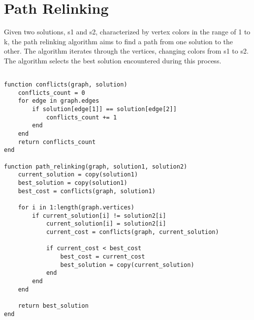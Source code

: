 \documentclass{article}
\begin{document}
\section{Path Relinking}
Given two solutions, s1 and s2, characterized by vertex colors in the range of 1 to k, 
the path relinking algorithm aims to find a path from one solution to the other. 
The algorithm iterates through the vertices, changing colors from s1 to s2.
The algorithm selects the best solution encountered during this process.
\begin{flushleft} 
\begin{lstlisting}[caption={Particle Swarm Optimization in Julia}]
    
function conflicts(graph, solution)
    conflicts_count = 0
    for edge in graph.edges
        if solution[edge[1]] == solution[edge[2]]
            conflicts_count += 1
        end
    end
    return conflicts_count
end

function path_relinking(graph, solution1, solution2)
    current_solution = copy(solution1)
    best_solution = copy(solution1)
    best_cost = conflicts(graph, solution1)

    for i in 1:length(graph.vertices)
        if current_solution[i] != solution2[i]
            current_solution[i] = solution2[i]
            current_cost = conflicts(graph, current_solution)

            if current_cost < best_cost
                best_cost = current_cost
                best_solution = copy(current_solution)
            end
        end
    end

    return best_solution
end

\end{lstlisting}
\end{flushleft}
\end{document}
